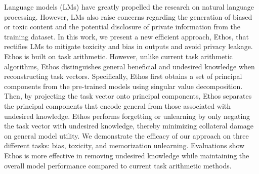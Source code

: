 Language models (LMs) have greatly propelled the research on natural language processing. However, LMs also raise concerns regarding the generation of biased or toxic content and the potential disclosure of private information from the training dataset. In this work, we present a new efficient approach, Ethos, that rectifies LMs to mitigate toxicity and bias in outputs and avoid privacy leakage. Ethos is built on task arithmetic. However, unlike current task arithmetic algorithms, Ethos distinguishes general beneficial and undesired knowledge when reconstructing task vectors. Specifically, Ethos first obtains a set of principal components from the pre-trained models using singular value decomposition. Then, by projecting the task vector onto principal components, Ethos separates the principal components that encode general from those associated with undesired knowledge. Ethos performs forgetting or unlearning by only negating the task vector with undesired knowledge, thereby minimizing collateral damage on general model utility. We demonstrate the efficacy of our approach on three different tasks: bias, toxicity, and memorization unlearning. Evaluations show Ethos is more effective in removing undesired knowledge while maintaining the overall model performance compared to current task arithmetic methods.